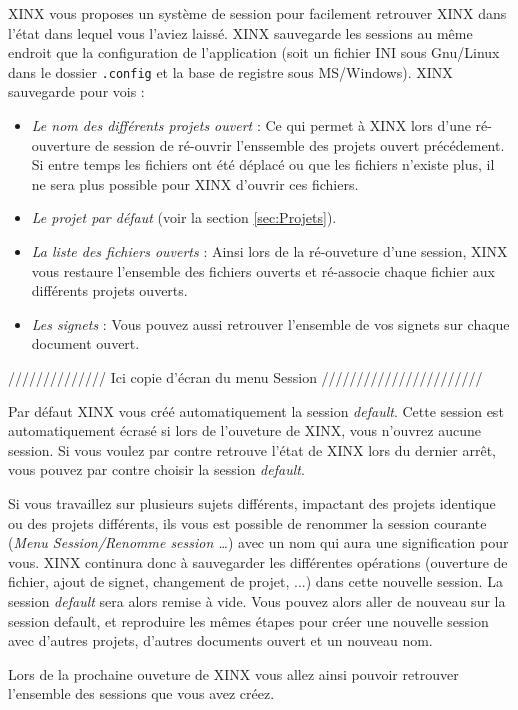 \documentclass[a4paper,10pt,twoside]{book}
\begin{document}
XINX vous proposes un système de session pour facilement retrouver XINX dans l'état dans lequel vous l'aviez laissé. XINX sauvegarde les sessions au même endroit que la configuration de l'application (soit un fichier INI sous Gnu/Linux dans le dossier \verb+.config+ et la base de registre sous MS/Windows). XINX sauvegarde pour vois :
\begin{itemize}
 \item \emph{Le nom des différents projets ouvert} : Ce qui permet à XINX lors d'une ré-ouverture de session de ré-ouvrir l'enssemble des projets ouvert précédement. Si entre temps les fichiers ont été déplacé ou que les fichiers n'existe plus, il ne sera plus possible pour XINX d'ouvrir ces fichiers.
 \item \emph{Le projet par défaut} (voir la section \ref{sec:Projets}).
 \item \emph{La liste des fichiers ouverts} : Ainsi lors de la ré-ouveture d'une session, XINX vous restaure l'ensemble des fichiers ouverts et ré-associe chaque fichier aux différents projets ouverts.
 \item \emph{Les signets} : Vous pouvez aussi retrouver l'ensemble de vos signets sur chaque document ouvert.
\end{itemize}

////////////// Ici copie d'écran du menu Session ///////////////////////

Par défaut XINX vous créé automatiquement la session \emph{default}. Cette session est automatiquement écrasé si lors de l'ouveture de XINX, vous n'ouvrez aucune session.  Si vous voulez par contre retrouve l'état de XINX lors du dernier arrêt, vous pouvez par contre choisir la session \emph{default}.

Si vous travaillez sur plusieurs sujets différents, impactant des projets identique ou des projets différents, ils vous est possible de renommer la session courante (\emph{Menu Session/Renomme session \dots}) avec un nom qui aura une signification pour vous. XINX continura donc à sauvegarder les différentes opérations (ouverture de fichier, ajout de signet, changement de projet, ...) dans cette nouvelle session. La session \emph{default} sera alors remise à vide.
Vous pouvez alors aller de nouveau sur la session default, et reproduire les mêmes étapes pour créer une nouvelle session avec d'autres projets, d'autres documents ouvert et un nouveau nom.

Lors de la prochaine ouveture de XINX vous allez ainsi pouvoir retrouver l'ensemble des sessions que vous avez créez.
\end{document}
